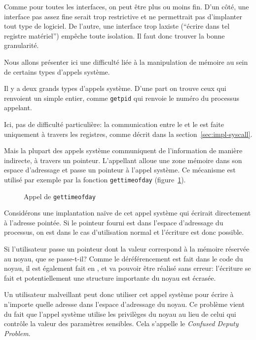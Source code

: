 Comme pour toutes les interfaces, on peut être plus ou moins fin. D'un côté, une
interface pas assez fine serait trop restrictive et ne permettrait pas
d'implanter tout type de logiciel. De l'autre, une interface trop laxiste
(\enquote{écrire dans tel registre matériel}) empêche toute isolation. Il faut
donc trouver la bonne granularité.

Nous allons présenter ici une difficulté liée à la manipulation de mémoire au
sein de certains types d'appels système.

Il y a deux grands types d'appels système. D'une part on trouve ceux qui
renvoient un simple entier, comme \texttt{getpid} qui renvoie le numéro du
processus appelant.


Ici, pas de difficulté particulière: la communication entre le  et le
 est faite uniquement à travers les registres, comme décrit dans la
section~\ref{sec:impl-syscall}.

Mais la plupart des appels système communiquent de l'information de manière
indirecte, à travers un pointeur. L'appellant alloue une zone mémoire dans son
espace d'adressage et passe un pointeur à l'appel système. Ce mécanisme est
utilisé par exemple par la fonction \texttt{gettimeofday}
(figure~\ref{fig:appel-gettimeofday}).

\begin{figure}[h]
\caption{Appel de \texttt{gettimeofday}}
\label{fig:appel-gettimeofday}
\end{figure}

Considérons une implantation naïve de cet appel système qui écrirait
directement \linebreak à l'adresse pointée. Si le pointeur fourni est dans l'espace
d'adressage du processus, on est dans le cas d'utilisation normal et l'écriture
est donc possible.

Si l'utilisateur passe un pointeur dont la valeur correspond à la mémoire
réservée au noyau, que se passe-t-il? Comme le déréférencement est fait dans le
code du noyau, il est également fait en , et va pouvoir être réalisé
sans erreur: l'écriture se fait et potentiellement une structure importante du
noyau est écrasée.

Un utilisateur malveillant peut donc utiliser cet appel système pour écrire à
n'importe quelle adresse dans l'espace d'adressage du noyau. Ce problème vient
du fait que l'appel système utilise les privilèges du noyau au lieu de celui qui
contrôle la valeur des paramètres sensibles. Cela s'appelle le \emph{Confused
Deputy Problem}\cite{hardy88confused}.

